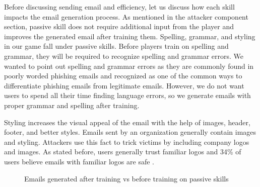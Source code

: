 Before discussing sending email and efficiency, let us discuss how each skill impacts the email generation process. As mentioned in the attacker component section, passive skill does not require additional input from the player and improves the generated email after training them. Spelling, grammar, and styling in our game fall under passive skills. Before players train on spelling and grammar, they will be required to recognize spelling and grammar errors. We wanted to point out spelling and grammar errors as they are commonly found in poorly worded phishing emails and recognized as one of the common ways to differentiate phishing emails from legitimate emails. However, we do not want users to spend all their time finding language errors, so we generate emails with proper grammar and spelling after training.

Styling increases the visual appeal of the email with the help of images, header, footer, and better styles. Emails sent by an organization generally contain images and styling. Attackers use this fact to trick victims by including company logos and images. As stated before, users generally trust familiar logos and 34\% of users believe emails with familiar logos are safe \cite{proofpoint}.

\begin{figure}[!ht]
    \centering

    \hfill
    \hfill

    \label{fig:passive}
    \caption{Emails generated after training vs before training on passive skills}
\end{figure}


